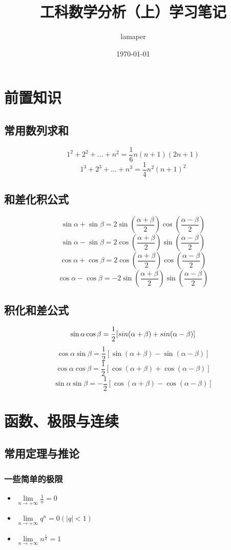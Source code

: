 \documentclass[12pt , a4paper , oneside]{ctexart}
\title{工科数学分析（上）学习笔记}
\author{lamaper}
\date{\today}
\begin{document}
    \maketitle

    
    \section{前置知识}
        \subsection{常用数列求和}
        $$1^2 + 2^2 + ...+n^2 = \frac{1}{6}n(n+1)(2n+1)$$
        $$1^3 + 2^3 + ...+n^3 = \frac{1}{4}n^2(n+1)^2$$  

        \subsection{和差化积公式}
        $$\sin \alpha + \sin \beta = 2\sin (\frac{\alpha + \beta}{2})\cos (\frac{\alpha - \beta}{2})$$
        $$\sin \alpha - \sin \beta = 2\cos (\frac{\alpha + \beta}{2})\sin (\frac{\alpha - \beta}{2})$$
        $$\cos \alpha + \cos \beta = 2\cos (\frac{\alpha + \beta}{2})\cos (\frac{\alpha - \beta}{2})$$
        $$\cos \alpha - \cos \beta = -2\sin (\frac{\alpha + \beta}{2})\sin (\frac{\alpha - \beta}{2})$$

        \subsection{积化和差公式}
        $$\sin \alpha \cos \beta = \frac{1}{2}[\\sin (\alpha + \beta) + \\sin (\alpha - \beta)]$$
        $$\cos \alpha \sin \beta = \frac{1}{2}[\sin (\alpha + \beta) - \sin (\alpha - \beta)]$$
        $$\cos \alpha \cos \beta = \frac{1}{2}[\cos (\alpha + \beta) + \cos (\alpha - \beta)]$$
        $$\sin \alpha \sin \beta = -\frac{1}{2}[\cos (\alpha + \beta) - \cos (\alpha - \beta)]$$

    \section{函数、极限与连续}
        \subsection{常用定理与推论}
            \subsubsection{一些简单的极限}
                \begin{itemize}
                \item $\lim\limits_{n \to +\infty} \frac{1}{n} = 0$
                \item $\lim\limits_{n \to +\infty} q^n = 0 (|q| < 1)$
                \item $\lim\limits_{n \to +\infty} n^\frac{1}{n} = 1$
                \end{itemize}
\end{document}
